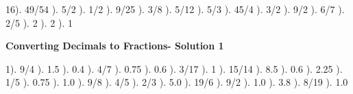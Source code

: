 \documentclass{article}%
\begin{document}
16). 49/54%
). 5/2%
). 1/2%
). 9/25%
). 3/8%
). 5/12%
). 5/3%
). 45/4%
). 3/2%
). 9/2%
). 6/7%
). 2/5%
). 2%
). 2%
). 1%
\newline%
\newpage%
\large%
\begin{center}%
\textbf{Converting Decimals to Fractions- Solution 1}%
\newline%
\end{center} \normalsize%
1). 9/4%
). 1.5%
). 0.4%
). 4/7%
). 0.75%
). 0.6%
). 3/17%
). 1%
). 15/14%
). 8.5%
). 0.6%
). 2.25%
). 1/5%
). 0.75%
). 1.0%
). 9/8%
). 4/5%
). 2/3%
). 5.0%
). 19/6%
). 9/2%
). 1.0%
). 3.8%
). 8/19%
). 1.0%
\newline%
\end{document}
